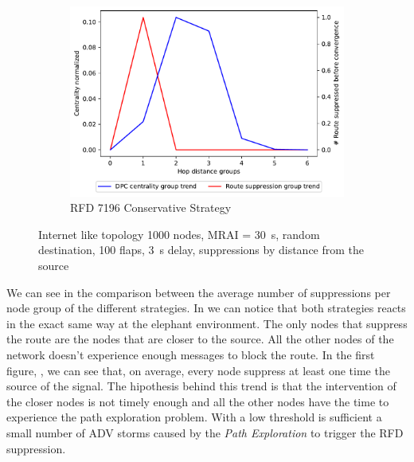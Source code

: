 \begin{figure}[h]
     \hfill
     \begin{subfigure}[b]{0.325\textwidth}
         \centering
         \includegraphics[width=\textwidth]{images/RFD/miceVSelephants/elephants/cisco_1000_RFD_7196_conservative_nodeConvergence_centVSsup_trend.pdf}
         \caption{RFD 7196 Conservative Strategy}
         \label{fig:1000_7196RFDC_cent_VS_sup_elephants}
     \end{subfigure}
		\caption{Internet like topology \num{1000} nodes, \ac{MRAI} = \SI{30}{\second}, 
		random destination, \num{100} flaps, \SI{3}{\second} delay, suppressions 
		by distance from the source}
        \label{fig:1000_RFD_cent_VS_sup_elephants}
\end{figure}

We can see in  the comparison between
the average number of suppressions per node group of the different strategies.
In 
we can notice that both strategies reacts in the exact same way at the elephant
environment.
The only nodes that suppress the route are the nodes that are closer to the source.
All the other nodes of the network doesn't experience enough messages to block 
the route.
In the first figure, , we can see
that, on average, every node suppress at least one time the source of the
signal.
The hipothesis behind this trend is that the intervention of the closer nodes
is not timely enough and all the other nodes have the time to experience the
path exploration problem.
With a low threshold is sufficient a small number of \ac{ADV} storms caused
by the \textit{Path Exploration} to trigger the \ac{RFD} suppression.

